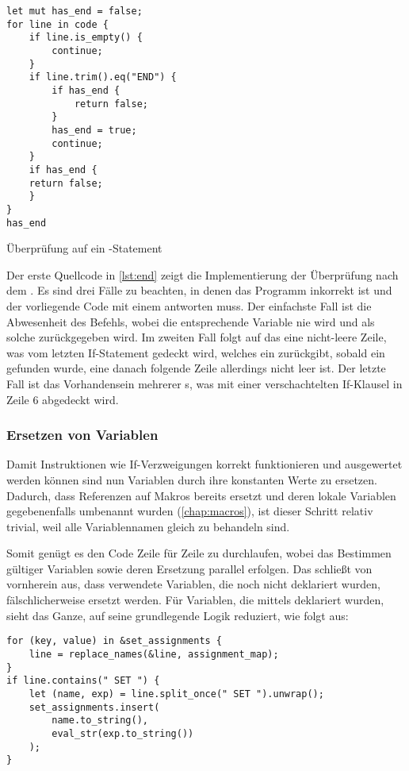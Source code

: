 \begin{listing}[th]
\begin{verbatim}
let mut has_end = false;
for line in code {
    if line.is_empty() {
        continue;
    }
    if line.trim().eq("END") {
        if has_end {
            return false;
        }
        has_end = true;
        continue;
    }
    if has_end {
    return false;
    }
}
has_end
\end{verbatim}
\label{lst:end}
\caption{Überprüfung auf ein -Statement}
\end{listing}

Der erste Quellcode in \ref{lst:end} zeigt die Implementierung der Überprüfung nach dem . Es sind drei Fälle zu beachten, in denen das Programm inkorrekt ist und der vorliegende Code mit einem  antworten muss. Der einfachste Fall ist die Abwesenheit des Befehls, wobei die entsprechende Variable nie  wird und als solche zurückgegeben wird. Im zweiten Fall folgt auf das  eine nicht-leere Zeile, was vom letzten If-Statement gedeckt wird, welches ein  zurückgibt, sobald ein  gefunden wurde, eine danach folgende Zeile allerdings nicht leer ist. Der letzte Fall ist das Vorhandensein mehrerer s, was mit einer verschachtelten If-Klausel in Zeile 6 abgedeckt wird.

\subsubsection{Ersetzen von Variablen}\label{chap:var-replacement}

Damit Instruktionen wie If-Verzweigungen korrekt funktionieren und ausgewertet werden können sind nun Variablen durch ihre konstanten Werte zu ersetzen. Dadurch, dass Referenzen auf Makros bereits ersetzt und deren lokale Variablen gegebenenfalls umbenannt wurden (\ref{chap:macros}), ist dieser Schritt relativ trivial, weil alle Variablennamen gleich zu behandeln sind.

Somit genügt es den Code Zeile für Zeile zu durchlaufen, wobei das Bestimmen gültiger Variablen sowie deren Ersetzung parallel erfolgen. Das schließt von vornherein aus, dass verwendete Variablen, die noch nicht deklariert wurden, fälschlicherweise ersetzt werden. Für Variablen, die mittels  deklariert wurden, sieht das Ganze, auf seine grundlegende Logik reduziert, wie folgt aus:

\begin{listing}[th]
\begin{verbatim}
for (key, value) in &set_assignments {
    line = replace_names(&line, assignment_map);
}
if line.contains(" SET ") {
    let (name, exp) = line.split_once(" SET ").unwrap();
    set_assignments.insert(
        name.to_string(),
        eval_str(exp.to_string())
    );
}
\end{verbatim}
\label{lst:var-replacement}
\end{listing}

